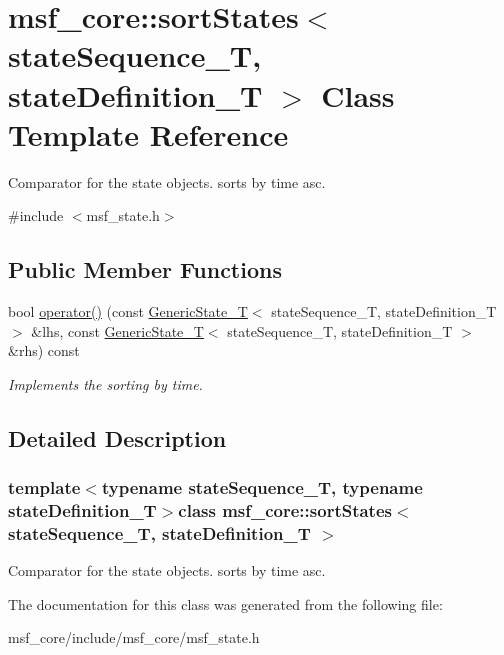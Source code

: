 \hypertarget{classmsf__core_1_1sortStates}{\section{msf\-\_\-core\-:\-:sort\-States$<$ state\-Sequence\-\_\-\-T, state\-Definition\-\_\-\-T $>$ Class Template Reference}
\label{classmsf__core_1_1sortStates}
}


Comparator for the state objects. sorts by time asc.  




{\ttfamily \#include $<$msf\-\_\-state.\-h$>$}

\subsection*{Public Member Functions}
\begin{DoxyCompactItemize}
\item 
\hypertarget{classmsf__core_1_1sortStates_aaf70a97b2e91c615ae35ad5fc14f0816}{bool \hyperlink{classmsf__core_1_1sortStates_aaf70a97b2e91c615ae35ad5fc14f0816}{operator()} (const \hyperlink{structmsf__core_1_1GenericState__T}{Generic\-State\-\_\-\-T}$<$ state\-Sequence\-\_\-\-T, state\-Definition\-\_\-\-T $>$ \&lhs, const \hyperlink{structmsf__core_1_1GenericState__T}{Generic\-State\-\_\-\-T}$<$ state\-Sequence\-\_\-\-T, state\-Definition\-\_\-\-T $>$ \&rhs) const }\label{classmsf__core_1_1sortStates_aaf70a97b2e91c615ae35ad5fc14f0816}

\begin{DoxyCompactList}\small\item\em Implements the sorting by time. \end{DoxyCompactList}\end{DoxyCompactItemize}


\subsection{Detailed Description}
\subsubsection*{template$<$typename state\-Sequence\-\_\-\-T, typename state\-Definition\-\_\-\-T$>$class msf\-\_\-core\-::sort\-States$<$ state\-Sequence\-\_\-\-T, state\-Definition\-\_\-\-T $>$}

Comparator for the state objects. sorts by time asc. 

The documentation for this class was generated from the following file\-:\begin{DoxyCompactItemize}
\item 
msf\-\_\-core/include/msf\-\_\-core/msf\-\_\-state.\-h\end{DoxyCompactItemize}
